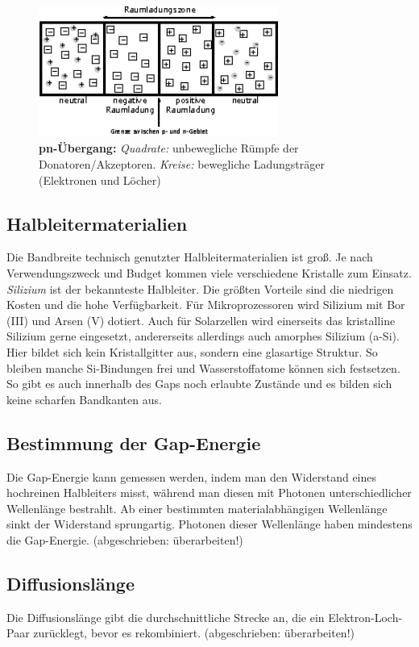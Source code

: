 \begin{figure}[htb]
	\centering
	\includegraphics[width=0.7\textwidth]{Abb/pn.eps}
	\caption{\textbf{pn-Übergang:} \emph{Quadrate:} unbewegliche Rümpfe der Donatoren/Akzeptoren. \emph{Kreise:} bewegliche Ladungsträger (Elektronen und Löcher)}
	\label{pn}
\end{figure}

\subsection*{Halbleitermaterialien}
Die Bandbreite technisch genutzter Halbleitermaterialien ist groß. Je nach Verwendungszweck und Budget kommen viele verschiedene Kristalle zum Einsatz.\\
\emph{Silizium} ist der bekannteste Halbleiter. Die größten Vorteile sind die niedrigen Kosten und die hohe Verfügbarkeit. Für Mikroprozessoren wird Silizium mit Bor (III) und Arsen (V) dotiert. Auch für Solarzellen wird einerseits das kristalline Silizium gerne eingesetzt, andererseits allerdings auch amorphes Silizium (a-Si). Hier bildet sich kein Kristallgitter aus, sondern eine glasartige Struktur. So bleiben manche Si-Bindungen frei und Wasserstoffatome können sich festsetzen. So gibt es auch innerhalb des Gaps noch erlaubte Zustände und es bilden sich keine scharfen Bandkanten aus. 


\subsection*{Bestimmung der Gap-Energie}
Die Gap-Energie kann gemessen werden, indem man den Widerstand eines hochreinen Halbleiters misst, während man diesen mit Photonen unterschiedlicher Wellenlänge bestrahlt. Ab einer bestimmten materialabhängigen Wellenlänge sinkt der Widerstand sprungartig. Photonen dieser Wellenlänge haben mindestens die Gap-Energie.
(abgeschrieben: überarbeiten!)

\subsection*{Diffusionslänge}
Die Diffusionslänge gibt die durchschnittliche Strecke an, die ein Elektron-Loch-Paar zurücklegt, bevor es rekombiniert. (abgeschrieben: überarbeiten!)

